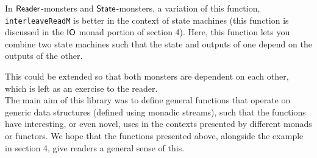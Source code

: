 In $\mathsf{Reader}$-monsters and $\mathsf{State}$-monsters, a variation of this function, \newline \verb+interleaveReadM+ is better in the context of state machines (this function is discussed in the $\mathsf{IO}$ monad portion of section 4). Here, this function lets you combine two state machines such that the state and outputs of one depend on the outputs of the other. 
This could be extended so that both monsters are dependent on each other, which is left as an exercise to the reader. \\

The main aim of this library was to define general functions that operate on generic data structures (defined using monadic streams), such that the functions have interesting, or even novel, uses in the contexts presented by different monads or functors. We hope that the functions presented above, alongside the example in section 4, give readers a general sense of this.
